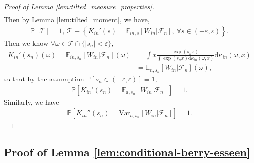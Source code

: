 \documentclass[12pt]{article}
\theoremstyle{definition}
\def\P{\mathbb{P}}
\def\P{\mathbb{P}}
\newcommand{\E}{\mathbb E}								%
\renewcommand{\P}{\mathbb{P}}							%
\begin{document}
\begin{proof}[Proof of Lemma \ref{lem:tilted_measure_properties}]
\begin{align*}
\end{align*}
Then by Lemma \ref{lem:tilted_moment}, we have,
\begin{align*}
	\P\left[\mathcal{T}\right]=1,\ \mathcal{T}\equiv \left\{K_{in}'(s)=\E_{in,s}[W_{in}|\mathcal{F}_n],\ \forall s\in (-\varepsilon,\varepsilon)\right\}.
\end{align*}
Then we know $\forall \omega\in\mathcal{T}\cap \{|s_n|<\varepsilon\}$,
\begin{align*}
	K_{in}'(s_n)(\omega)=\E_{in,s_n}[W_{in}|\mathcal{F}_n](\omega)
	&
	=\int x\frac{\exp(s_nx)}{\int \exp(s_nx)\mathrm{d}\kappa_{in}(\omega,x)}\mathrm{d}\kappa_{in}(\omega,x)\\
	&
	=\E_{n,s_n}[W_{in}|\mathcal{F}_n](\omega),
\end{align*}
so that by the assumption $\P[s_n\in (-\varepsilon,\varepsilon)]=1$,
\begin{align*}
	\P\left[K_{in}'(s_n)=\E_{n,s_n}[W_{in}|\mathcal{F}_n]\right]=1.
\end{align*}
Similarly, we have 
\begin{align*}
	\P\left[K_{in}''(s_n)=\mathrm{Var}_{n,s_n}[W_{in}|\mathcal{F}_n]\right]=1.
\end{align*}
\end{proof}
	




	\subsection{Proof of Lemma \ref{lem:conditional-berry-esseen}}
\end{document}
